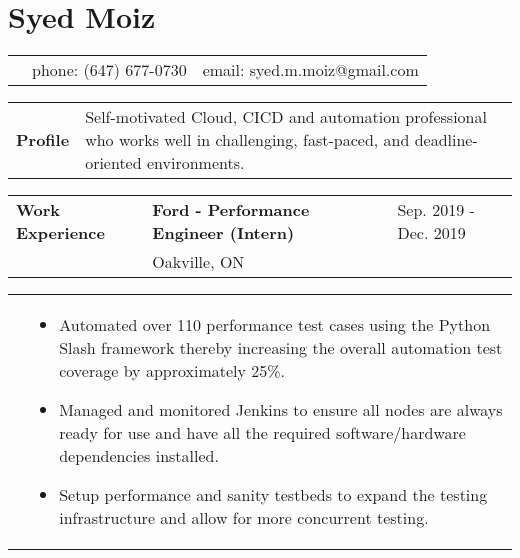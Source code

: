 \documentclass[letter, 10.5pt]{article}
\newcommand\sectionspacing{0.6cm}
\newcommand\bulletspacing{-0.15cm}
\newcommand\firstcolwidth{2.5cm}
\newcommand\listwidth{0.809\textwidth}
\begin{document}
    \section*{\textbf{Syed Moiz}}
    \begin{tabularx}{\textwidth}{Xll}
        & phone: (647) 677-0730 & email: syed.m.moiz@gmail.com \\
    \end{tabularx}
    \newline
    \vspace{0.7cm}
    \newline
    \begin{tabularx}{\textwidth}{@{}p{\firstcolwidth}X}
        \textbf{Profile} & Self-motivated Cloud, CICD and automation professional who works well in challenging, fast-paced, and deadline-oriented environments. \\
    \end{tabularx}
    \newline
    \vspace{\sectionspacing}
    \newline
    \begin{tabularx}{\textwidth}{@{}p{\firstcolwidth}Xl}
        \textbf{Work Experience} & \textbf{Ford - Performance Engineer (Intern)} & Sep. 2019 - Dec. 2019 \\
        & Oakville, ON & \\
    \end{tabularx}
    \newline
    \begin{tabularx}{\textwidth}{@{}p{\firstcolwidth}X}
        & 
        \begin{minipage}[t]{\listwidth}
            \begin{itemize}
                \vspace{-0.3cm}
                \item Automated over 110 performance test cases using the Python Slash framework thereby increasing the overall automation test coverage by approximately 25\%.
                \vspace{\bulletspacing}
                \item Managed and monitored Jenkins to ensure all nodes are always ready for use and have all the required software/hardware dependencies installed.
                \vspace{\bulletspacing}
                \item Setup performance and sanity testbeds to expand the testing infrastructure and allow for more concurrent testing.
            \end{itemize}
        \end{minipage} \\
    \end{tabularx}
\end{document}
